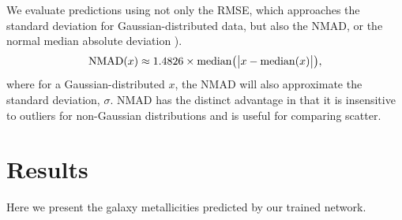 \documentclass[fleqn,usenatbib]{mnras}
\begin{document}

We evaluate predictions using not only the RMSE, which approaches the standard deviation for Gaussian-distributed data, but also the NMAD, or the normal median absolute deviation ).
\begin{equation}
{\rm NMAD}(x) \approx 1.4826 \times {\rm median} \big (\big|x - {\rm median }(x) \big|\big ),
\end{equation}
where for a Gaussian-distributed $x$, the NMAD will also approximate the standard deviation, $\sigma$.
NMAD has the distinct advantage in that it is insensitive to outliers for non-Gaussian distributions and is useful for comparing scatter.


\section{Results}\label{sec:results}
Here we present the galaxy metallicities predicted by our trained network.
\end{document}
